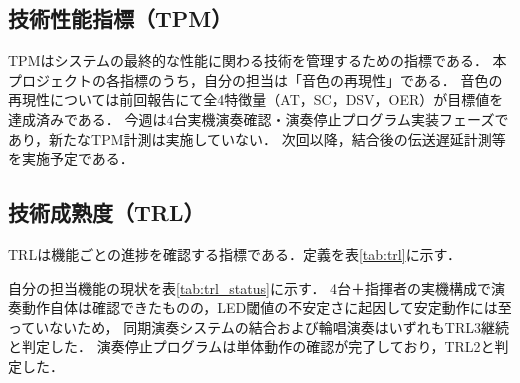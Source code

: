 \documentclass[lualatex,paper=a4paper,jafontsize=11.5pt,jafontscale=1.05]{jlreq}
\begin{document}
\subsection{技術性能指標（TPM）}
TPMはシステムの最終的な性能に関わる技術を管理するための指標である．
本プロジェクトの各指標のうち，自分の担当は「音色の再現性」である．
音色の再現性については前回報告にて全4特徴量（AT，SC，DSV，OER）が目標値を達成済みである．
今週は4台実機演奏確認・演奏停止プログラム実装フェーズであり，新たなTPM計測は実施していない．
次回以降，結合後の伝送遅延計測等を実施予定である．

\subsection{技術成熟度（TRL）}
TRLは機能ごとの進捗を確認する指標である．定義を表\ref{tab:trl}に示す．

\begin{table}[H]
  \centering
  \caption{TRLの定義}
  \label{tab:trl}
\end{table}

自分の担当機能の現状を表\ref{tab:trl_status}に示す．
4台＋指揮者の実機構成で演奏動作自体は確認できたものの，LED閾値の不安定さに起因して安定動作には至っていないため，
同期演奏システムの結合および輪唱演奏はいずれもTRL3継続と判定した．
演奏停止プログラムは単体動作の確認が完了しており，TRL2と判定した．

\begin{table}[H]
  \centering
  \caption{担当機能のTRL現状}
  \label{tab:trl_status}
\end{table}
\end{document}
